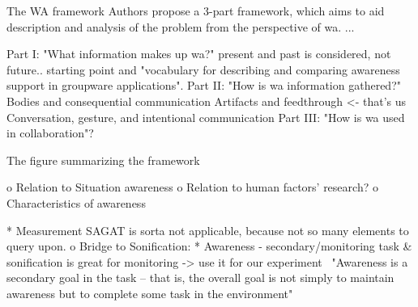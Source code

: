 The WA framework
Authors propose a 3-part framework, which aims to aid description and analysis of the problem from the perspective of \gls{wa}. ...

Part I: "What information makes up \gls{wa}?"
present and past is considered, not future..
starting point and "vocabulary for describing and comparing awareness support in groupware applications".
Part II: "How is \gls{wa} information gathered?"
Bodies and consequential communication
Artifacts and feedthrough <- that's us
Conversation, gesture, and intentional communication
Part III: "How is \gls{wa} used in collaboration"?

The figure summarizing the framework

o Relation to Situation awareness
o Relation to human factors’ research?
o Characteristics of awareness

* Measurement
SAGAT is sorta not applicable, because not so many elements to query upon.
o Bridge to Sonification: 
* Awareness - secondary/monitoring task \& sonification is great for monitoring -> use it for our experiment 
"Awareness is a secondary goal in the task – that is, the overall goal is not simply to maintain awareness but to complete some task in the environment"


